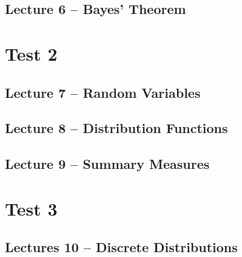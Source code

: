 \documentclass{article}
\begin{document}
\subsection{Lecture 6 -- Bayes' Theorem}
\newpage

\section{Test 2}

\secttoc

\subsection{Lecture 7 -- Random Variables}
\newpage

\subsection{Lecture 8 -- Distribution Functions}
\newpage

\subsection{Lecture 9 -- Summary Measures}
\newpage

\section{Test 3}

\secttoc

\subsection{Lectures 10 -- Discrete Distributions}
\newpage

\end{document}
